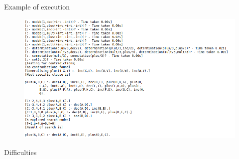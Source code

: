 \begin{frame}{Example of execution}

\begin{figure}
    \centering
\includegraphics[width=\textwidth]{images/Details_progol.png}
\end{figure}
\end{frame}


\begin{frame}{Difficulties}
    
\end{frame}
